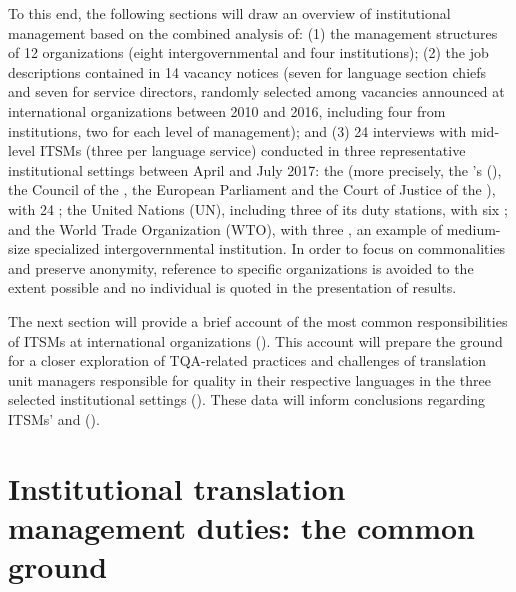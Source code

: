 \documentclass[output=paper]{langsci/langscibook}
\begin{document}
To this end, the following sections will draw an overview of institutional  management based on the combined analysis of: (1) the management structures of 12 organizations (eight intergovernmental and four  institutions); (2) the job descriptions contained in 14  vacancy notices (seven for language section chiefs and seven for service directors, randomly selected among vacancies announced at international organizations between 2010 and 2016, including four from  institutions, two for each level of management); and (3) 24 interviews with mid-level ITSMs (three per language service) conducted in three representative institutional settings between April and July 2017: the  (more precisely, the ’s  (), the Council of the , the European Parliament and the Court of Justice of the ), with 24 ; the United Nations (UN), including three of its duty stations, with six ; and the World Trade Organization (WTO), with three , an example of medium-size specialized intergovernmental institution. In order to focus on commonalities and preserve anonymity, reference to specific organizations is avoided to the extent possible and no individual  is quoted in the presentation of results.



The next section will provide a brief account of the most common responsibilities of ITSMs at international organizations (). This account will prepare the ground for a closer exploration of TQA-related practices and challenges of translation unit managers responsible for quality in their respective languages in the three selected institutional settings (). These data will inform conclusions regarding ITSMs’ and  ().  



\section{Institutional translation management duties: the common ground}\label{sec:prietoramos:2}
\end{document}
